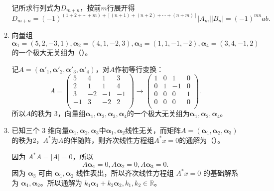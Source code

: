 \begin{enumerate}[1~]
\begin{enumerate}[1.~]
\begin{solution}
记所求行列式为$D_{m+n}$，按前$m$行展开得\[
D_{m+n}=(-1)^{(1+2+\cdots+m)+[(n+1)+(n+2)+\cdots+(n+m)]}|A_m||B_n|=(-1)^{mn}ab.
\]
\end{solution}

\item
向量组$\boldsymbol{\alpha} _ { 1 } = ( 5,2 , - 3,1 ) ,  \boldsymbol{\alpha} _ { 2 } = ( 4,1 , - 2,3 ) ,  \boldsymbol{\alpha} _ { 3 } = ( 1,1 , - 1 , - 2 ) ,  \boldsymbol{\alpha} _ { 4 } = ( 3,4 , - 1,2 )$的一个极大无关组为（\quad）。
\begin{solution}
记$A=(\boldsymbol{\alpha}'_1, \boldsymbol{\alpha}'_2, \boldsymbol{\alpha}'_3, \boldsymbol{\alpha}'_4)$，对$A$作初等行变换：\[
A=\left( \begin{matrix}
	5&		4&		1&		3\\
	2&		1&		1&		4\\
	3&		-2&		-1&		-1\\
	-1&		3&		-2&		2\\
\end{matrix} \right) \longrightarrow \left(
\begin{array}{cccc}
 1 & 0 & 1 & 0 \\
 0 & 1 & -1 & 0 \\
 0 & 0 & 0 & 1 \\
 0 & 0 & 0 & 0 \\
\end{array}
\right) .
\]
所以$A$的秩为 $3$，向量组$\boldsymbol{\alpha} _ { 1 },  \boldsymbol{\alpha} _ { 2 } ,  \boldsymbol{\alpha} _ { 3 } ,  \boldsymbol{\alpha} _ { 4 } $的一个极大无关组为$\boldsymbol{\alpha} _ { 1 },  \boldsymbol{\alpha} _ { 2 } ,  \boldsymbol{\alpha} _ { 4 } $。
\end{solution}

\item
已知三个 $3$ 维向量$\boldsymbol{\alpha} _ { 1 } ,  \boldsymbol{\alpha} _ { 2 } ,  \boldsymbol{\alpha} _ { 3 }$中$\boldsymbol{\alpha} _ { 1 } ,  \boldsymbol{\alpha} _ { 2 }$线性无关，而矩阵$A = \left( \boldsymbol{\alpha} _ { 1 } , \boldsymbol{\alpha} _ { 2 } , \boldsymbol{\alpha} _ { 3 } \right)$的秩为2，$A^*$为$A$的伴随阵，则齐次线性方程组$A^*x=0$的通解为（\quad）。
\begin{solution}
因为 $A^* A=|A|=0$，所以\[
A\boldsymbol{\alpha}_1=0, A\boldsymbol{\alpha}_2=0, A \boldsymbol{\alpha}_3 = 0.
\]
因为 $\boldsymbol{\alpha}_3$ 可由 $\boldsymbol{\alpha}_1, \boldsymbol{\alpha}_2$ 线性表出，所以齐次线性方程组 $A^*x = 0$ 的基础解系为 $\boldsymbol{\alpha}_1, \boldsymbol{\alpha}_2$。所以通解为 $k_1 \boldsymbol{\alpha}_1 + k_2 \boldsymbol{\alpha}_2, k_1, k_2 \in \mathbb{R}$。
\end{solution}


\end{enumerate}
\end{enumerate}
